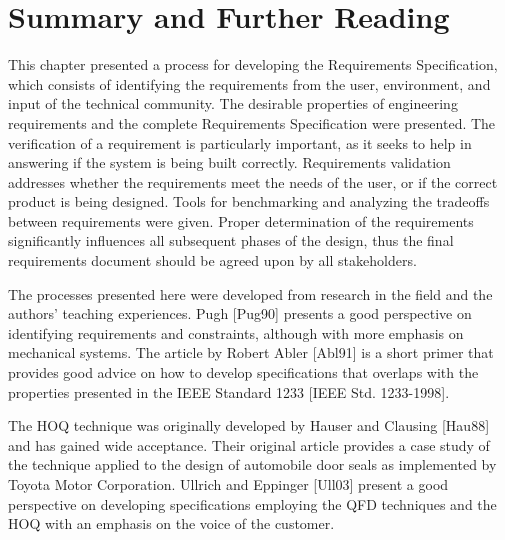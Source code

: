 \section{Summary and Further Reading }
\label{section:summary-and-further-reading}

This chapter presented a process for developing the Requirements
Specification, which consists of identifying the requirements from the
user, environment, and input of the technical community. The desirable
properties of engineering requirements and the complete Requirements
Specification were presented. The verification of a requirement is
particularly important, as it seeks to help in answering if the system
is being built correctly. Requirements validation addresses whether the
requirements meet the needs of the user, or if the correct product is
being designed. Tools for benchmarking and analyzing the tradeoffs
between requirements were given. Proper determination of the
requirements significantly influences all subsequent phases of the
design, thus the final requirements document should be agreed upon by
all stakeholders.

The processes presented here were developed from research in the field
and the authors' teaching experiences. Pugh {[}Pug90{]} presents a good
perspective on identifying requirements and constraints, although with
more emphasis on mechanical systems. The article by Robert Abler
{[}Abl91{]} is a short primer that provides good advice on how to
develop specifications that overlaps with the properties presented in
the IEEE Standard 1233 {[}IEEE Std. 1233-1998{]}.

The HOQ technique was originally developed by Hauser and Clausing
{[}Hau88{]} and has gained wide acceptance. Their original article
provides a case study of the technique applied to the design of
automobile door seals as implemented by Toyota Motor Corporation.
Ullrich and Eppinger {[}Ull03{]} present a good perspective on
developing specifications employing the QFD techniques and the HOQ with
an emphasis on the voice of the customer.
